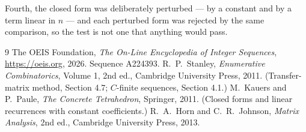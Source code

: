 \documentclass[11pt,a4paper]{article}
\theoremstyle{plain}
\theoremstyle{definition}
\begin{document}
Fourth, the closed form was deliberately perturbed --- by a constant and by a term linear in
$n$ --- and each perturbed form was rejected by the same comparison, so the test is not one
that anything would pass.

\begin{thebibliography}{9}
 The OEIS Foundation, \emph{The On-Line Encyclopedia of Integer
Sequences}, \url{https://oeis.org}, 2026. Sequence A224393.
 R.~P.~Stanley, \emph{Enumerative Combinatorics}, Volume 1, 2nd ed.,
Cambridge University Press, 2011. (Transfer-matrix method, Section 4.7; $C$-finite sequences,
Section 4.1.)
 M.~Kauers and P.~Paule, \emph{The Concrete Tetrahedron}, Springer, 2011.
(Closed forms and linear recurrences with constant coefficients.)
 R.~A.~Horn and C.~R.~Johnson, \emph{Matrix Analysis}, 2nd ed., Cambridge
University Press, 2013.
\end{thebibliography}
\end{document}
